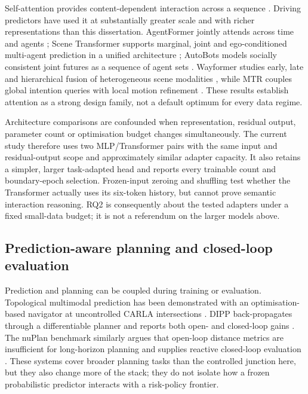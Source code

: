 Self-attention provides content-dependent interaction across a sequence
\citep{vaswani2017attention}. Driving predictors have used it at substantially
greater scale and with richer representations than this dissertation.
AgentFormer jointly attends across time and agents
\citep{yuan2021agentformer}; Scene Transformer supports marginal, joint and
ego-conditioned multi-agent prediction in a unified architecture
\citep{ngiam2022scene}; AutoBots models socially consistent joint futures as a
sequence of agent sets \citep{girgis2022autobots}. Wayformer studies early,
late and hierarchical fusion of heterogeneous scene modalities
\citep{nayakanti2023wayformer}, while MTR couples global intention queries with
local motion refinement \citep{shi2022mtr}. These results establish attention
as a strong design family, not a default optimum for every data regime.

Architecture comparisons are confounded when representation, residual output,
parameter count or optimisation budget changes simultaneously. The current
study therefore uses two MLP/Transformer pairs with the same input and
residual-output scope and approximately similar adapter capacity. It also
retains a simpler, larger task-adapted head and reports every trainable count
and boundary-epoch selection. Frozen-input zeroing and shuffling test whether
the Transformer actually uses its six-token history, but cannot prove semantic
interaction reasoning. RQ2 is consequently about the tested adapters under a
fixed small-data budget; it is not a referendum on the larger models above.

\subsection{Prediction-aware planning and closed-loop evaluation}

Prediction and planning can be coupled during training or evaluation.
Topological multimodal prediction has been demonstrated with an
optimisation-based navigator at uncontrolled CARLA intersections
\citep{roh2021topological}. DIPP back-propagates through a differentiable
planner and reports both open- and closed-loop gains
\citep{huang2023dipp}. The nuPlan benchmark similarly argues that open-loop
distance metrics are insufficient for long-horizon planning and supplies
reactive closed-loop evaluation \citep{caesar2021nuplan}. These systems cover
broader planning tasks than the controlled junction here, but they also change
more of the stack; they do not isolate how a frozen probabilistic predictor
interacts with a risk-policy frontier.

